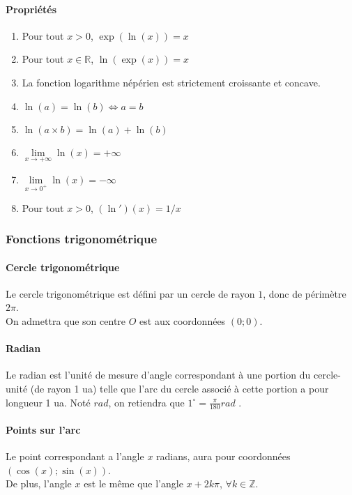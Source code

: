 \documentclass{article}
\begin{document}
\paragraph{Propriétés}
\begin{enumerate}
	\item Pour tout $x>0$,  $\exp(\ln(x)) = x$
	\item Pour tout $x \in \mathbb{R}$, $\ln(\exp(x)) = x$
	\item La fonction logarithme népérien est strictement croissante et concave.
	\item $\ln(a) = \ln(b) \Leftrightarrow a=b$
	\item $\ln(a\times b) = \ln(a) + \ln(b)$
	\item $\lim \limits_{x \rightarrow +\infty} \ln(x) = +\infty$
	\item $\lim \limits_{x \rightarrow 0^+}\ln(x) = -\infty$
	\item Pour tout $x>0$, $(\ln ')(x) = 1/x$
\end{enumerate}


\subsubsection{Fonctions trigonométrique }

\paragraph{Cercle trigonométrique}
Le cercle trigonométrique est défini par un cercle de rayon $1$, donc de périmètre $2\pi$.\\
On admettra que son centre $O$ est aux coordonnées $(0;0)$.

\paragraph{Radian}
Le radian est l'unité de mesure d'angle correspondant à une portion du cercle-unité (de rayon 1 ua) telle que l'arc du cercle associé à cette portion a pour longueur 1 ua. Noté $rad$, on retiendra que $1^\circ= \frac{\pi}{180} rad$ .

\paragraph{Points sur l'arc}
Le point correspondant a l'angle $x$ radians, aura pour coordonnées $(\cos(x);\sin(x))$. \\De plus, l'angle $x$ est le même que l'angle $x +2k\pi$, $\forall k \in \mathbb{Z}$.
\end{document}
